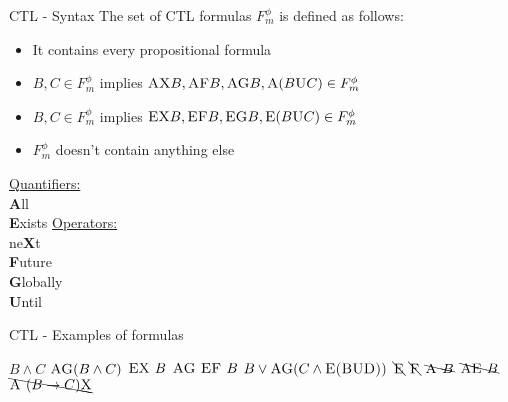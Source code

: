 \documentclass{beamer}
\begin{document}
\begin{frame}{CTL - Syntax}
    The set of CTL formulas $F_m^\phi$ is defined as follows:
    \begin{itemize}
        \item It contains every propositional formula
        \item $B,C \in F_m^\phi$ implies $\textsc{AX}B,\textsc{AF}B,\textsc{AG}B,\textsc{A}(B\textsc{U}C) \in F_m^\phi$
        \item $B,C \in F_m^\phi$ implies $\textsc{EX}B,\textsc{EF}B,\textsc{EG}B,\textsc{E}(B\textsc{U}C) \in F_m^\phi$
        \item $F_m^\phi$ doesn’t contain anything else
    \end{itemize}
    \vspace{1em}
    \begin{center}
        \begin{multicols}{2}
            \underline{Quantifiers:}\\\vspace{1em}
            \textbf{A}ll\\
            \textbf{E}xists
            \endgraf
            \columnbreak
            \underline{Operators:}\\\vspace{1em}
            ne\textbf{X}t\\
            \textbf{F}uture\\
            \textbf{G}lobally\\
            \textbf{U}ntil
        \end{multicols}
    \end{center}
\end{frame}

\begin{frame}{CTL - Examples of formulas}
    \begin{multicols}{2}
        $B \land C$\endgraf\bigskip
        $\textsc{AG}(B \land C)$\endgraf\bigskip
        $\textsc{EX }B$\endgraf\bigskip
        $\textsc{AG EF }B$\endgraf\bigskip
        $B \lor \textsc{AG}(C \land \textsc{E(B\textsc{U}D)})$\endgraf
        \endgraf
        \columnbreak
        \hspace{2em}
        $\bcancel{\textsc{E}}$\endgraf\bigskip
        \hspace{2em}
        $\bcancel{\textsc{F}}$\endgraf\bigskip
        \hspace{2em}
        $\bcancel{\textsc{A }B}$\endgraf\bigskip
        \hspace{2em}
        $\bcancel{\textsc{AE }B}$\endgraf\bigskip
        \hspace{2em}
        $\bcancel{\textsc{A }(B \to C)\textsc{X}}$\endgraf\bigskip
    \end{multicols}
\end{frame}
\end{document}
